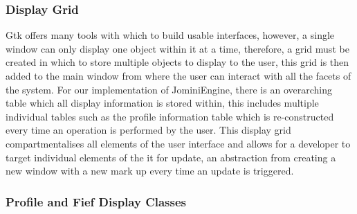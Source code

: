 \documentclass{article}
\begin{document}
\subsubsection{Display Grid}
Gtk offers many tools with which to build usable interfaces, however, a single window can only display one object within it at a time, therefore, a grid must be created in which to store multiple objects to display to the user, this grid is then added to the main window from where the user can interact with all the facets of the system. For our implementation of JominiEngine, there is an overarching table which all display information is stored within, this includes multiple individual tables such as the profile information table which is re-constructed every time an operation is performed by the user. This display grid compartmentalises all elements of the user interface and allows for a developer to target individual elements of the it for update, an abstraction from creating a new window with a new mark up every time an update is triggered.

\subsubsection{Profile and Fief Display Classes}
\end{document}
